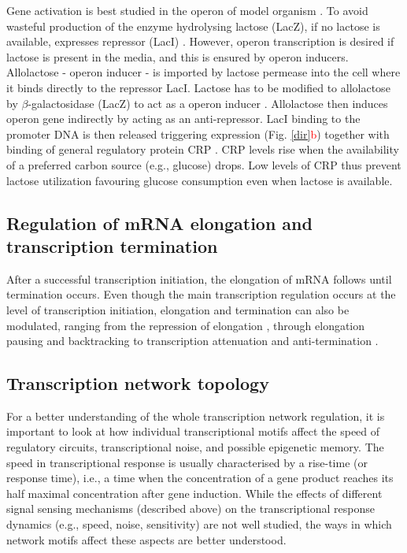 Gene activation is best studied in the  operon of model organism .
To avoid wasteful production of the enzyme hydrolysing lactose (LacZ), if no lactose is available,  expresses  repressor (LacI) \cite{hudson1990co}.
However,  operon transcription is desired if lactose is present in the media, and this is ensured by  operon inducers.
Allolactose -  operon inducer - is imported by lactose permease into the cell where it binds directly to the repressor LacI.
Lactose has to be modified to allolactose by $\beta$-galactosidase (LacZ) to act as a  operon inducer \cite{jobe1972lac, wheatley2013structural}.
Allolactose then induces  operon gene indirectly by acting as an anti-repressor.
LacI binding to the promoter DNA is then released triggering  expression (Fig. \ref{dir}\textcolor{red}{b}) together with binding of general regulatory protein CRP \cite{hudson1990co, clark2005molecular}.
CRP levels rise when the availability of a preferred carbon source (e.g., glucose) drops.
Low levels of CRP thus prevent lactose utilization favouring glucose consumption even when lactose is available.

\subsection{Regulation of mRNA elongation and transcription termination}
After a successful transcription initiation, the elongation of mRNA follows until termination occurs.
Even though the main transcription regulation occurs at the level of transcription initiation, elongation and termination can also be modulated, ranging from the repression of elongation \cite{monsalve1996protein}, through elongation pausing and backtracking \cite{mustaev2017transcription} to transcription attenuation and anti-termination \cite{naville2009transcription}.

\subsection{Transcription network topology}
For a better understanding of the whole transcription network regulation, it is important to look at how individual transcriptional motifs affect the speed of regulatory circuits, transcriptional noise, and possible epigenetic memory.
The speed in transcriptional response is usually characterised by a rise-time (or response time), i.e., a time when the concentration of a gene product reaches its half maximal concentration after gene induction.
While the effects of different signal sensing mechanisms (described above) on the transcriptional response dynamics (e.g., speed, noise, sensitivity) are not well studied, the ways in which network motifs affect these aspects are better understood.

